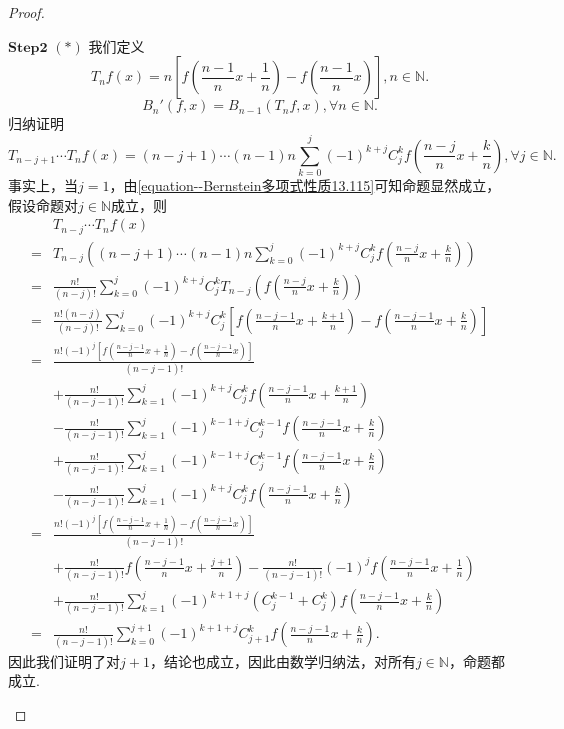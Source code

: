 \documentclass[../../main.tex]{subfiles}%
\begin{document}
\begin{proof}
\begin{enumerate}[(1)]
$\mathbf{Step}\mathbf{2}$ \((*)\) 我们定义
\[
T_nf(x)=n\left[f\left(\frac{n - 1}{n}x+\frac{1}{n}\right)-f\left(\frac{n - 1}{n}x\right)\right],n\in\mathbb{N}.
\]
\[
B_n'(f,x)=B_{n - 1}(T_nf,x),\forall n\in\mathbb{N}.
\]
归纳证明
\[
T_{n - j + 1}\cdots T_nf(x)=(n - j + 1)\cdots(n - 1)n\sum_{k = 0}^j(-1)^{k + j}C_j^kf\left(\frac{n - j}{n}x+\frac{k}{n}\right),\forall j\in\mathbb{N}.
\]
事实上，当\(j = 1\)，由\eqref{equation--Bernstein多项式性质13.115}可知命题显然成立，假设命题对\(j\in\mathbb{N}\)成立，则
\begin{align*}
&T_{n - j}\cdots T_nf(x)\\
=&T_{n - j}\left((n - j + 1)\cdots(n - 1)n\sum_{k = 0}^j(-1)^{k + j}C_j^kf\left(\frac{n - j}{n}x+\frac{k}{n}\right)\right)\\
=&\frac{n!}{(n - j)!}\sum_{k = 0}^j(-1)^{k + j}C_j^kT_{n - j}\left(f\left(\frac{n - j}{n}x+\frac{k}{n}\right)\right)\\
=&\frac{n!(n - j)}{(n - j)!}\sum_{k = 0}^j(-1)^{k + j}C_j^k\left[f\left(\frac{n - j - 1}{n}x+\frac{k + 1}{n}\right)-f\left(\frac{n - j - 1}{n}x+\frac{k}{n}\right)\right]\\
=&\frac{n!(-1)^j\left[f\left(\frac{n - j - 1}{n}x+\frac{1}{n}\right)-f\left(\frac{n - j - 1}{n}x\right)\right]}{(n - j - 1)!}\\
&+\frac{n!}{(n - j - 1)!}\sum_{k = 1}^j(-1)^{k + j}C_j^kf\left(\frac{n - j - 1}{n}x+\frac{k + 1}{n}\right)\\
&-\frac{n!}{(n - j - 1)!}\sum_{k = 1}^j(-1)^{k - 1 + j}C_j^{k - 1}f\left(\frac{n - j - 1}{n}x+\frac{k}{n}\right)\\
&+\frac{n!}{(n - j - 1)!}\sum_{k = 1}^j(-1)^{k - 1 + j}C_j^{k - 1}f\left(\frac{n - j - 1}{n}x+\frac{k}{n}\right)\\
&-\frac{n!}{(n - j - 1)!}\sum_{k = 1}^j(-1)^{k + j}C_j^kf\left(\frac{n - j - 1}{n}x+\frac{k}{n}\right)\\
=&\frac{n!(-1)^j\left[f\left(\frac{n - j - 1}{n}x+\frac{1}{n}\right)-f\left(\frac{n - j - 1}{n}x\right)\right]}{(n - j - 1)!}\\
&+\frac{n!}{(n - j - 1)!}f\left(\frac{n - j - 1}{n}x+\frac{j + 1}{n}\right)-\frac{n!}{(n - j - 1)!}(-1)^jf\left(\frac{n - j - 1}{n}x+\frac{1}{n}\right)\\
&+\frac{n!}{(n - j - 1)!}\sum_{k = 1}^{j}(-1)^{k + 1 + j}(C_j^{k - 1}+C_j^k)f\left(\frac{n - j - 1}{n}x+\frac{k}{n}\right)\\
=&\frac{n!}{(n - j - 1)!}\sum_{k = 0}^{j + 1}(-1)^{k + 1 + j}C_{j + 1}^kf\left(\frac{n - j - 1}{n}x+\frac{k}{n}\right).
\end{align*}
因此我们证明了对\(j + 1\)，结论也成立，因此由数学归纳法，对所有\(j\in\mathbb{N}\)，命题都成立.


\end{enumerate}
\end{proof}
\end{document}
